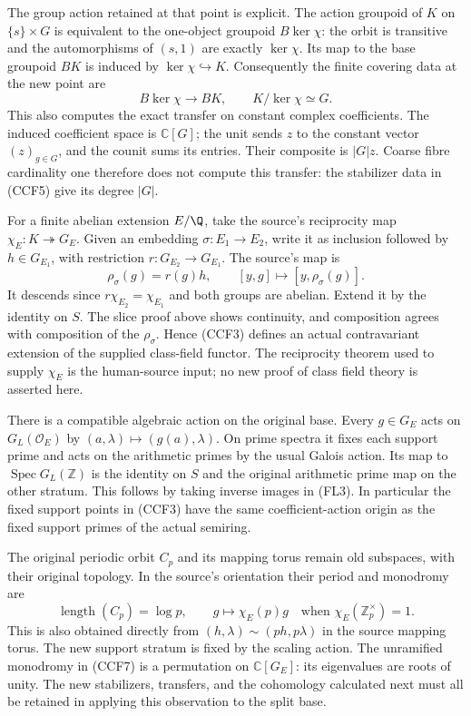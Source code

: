 \documentclass[11pt,a4paper]{article}
\theoremstyle{definition}\newtheorem{definition}[theorem]{Definition}
\newcommand{\Spec}{\operatorname{Spec}}\newcommand{\SpecMon}{\operatorname{Spec}_{\mathrm{mon}}}
\begin{document}
The group action retained at that point is explicit. The action
groupoid of $K$ on $\{s\}\times G$ is equivalent to the one-object
groupoid $B\ker\chi$: the orbit is transitive and the automorphisms
of $(s,1)$ are exactly $\ker\chi$. Its map to the base groupoid
$BK$ is induced by $\ker\chi\hookrightarrow K$. Consequently
the finite covering data at the new point are
\[
 B\ker\chi\longrightarrow BK,\qquad K/\ker\chi\simeq G.
 \tag{CCF5}
\]
This also computes the exact transfer on constant complex
coefficients. The induced coefficient space is $\mathbb C[G]$;
the unit sends $z$ to the constant vector $(z)_{g\in G}$, and the
counit sums its entries. Their composite is $|G|z$. Coarse fibre
cardinality one therefore does not compute this transfer: the
stabilizer data in (CCF5) give its degree $|G|$.

For a finite abelian extension $E/\Q$, take the source's reciprocity
map $\chi_E:K\twoheadrightarrow G_E$. Given an embedding
$\sigma:E_1\to E_2$, write it as inclusion followed by $h\in G_{E_1}$,
with restriction $r:G_{E_2}\to G_{E_1}$. The source's map is
\[
 \rho_\sigma(g)=r(g)h,\qquad
 [y,g]\longmapsto[y,\rho_\sigma(g)].
 \tag{CCF6}
\]
It descends since $r\chi_{E_2}=\chi_{E_1}$ and both groups are
abelian. Extend it by the identity on $S$. The slice proof above
shows continuity, and composition agrees with composition of the
$\rho_\sigma$. Hence (CCF3) defines an actual contravariant
extension of the supplied class-field functor. The reciprocity
theorem used to supply $\chi_E$ is the human-source input; no
new proof of class field theory is asserted here.

There is a compatible algebraic action on the original base.
Every $g\in G_E$ acts on $G_L(\mathcal O_E)$ by
$(a,\lambda)\mapsto(g(a),\lambda)$. On prime spectra it fixes
each support prime and acts on the arithmetic primes by the usual
Galois action. Its map to $\Spec G_L(\mathbb Z)$ is the identity
on $S$ and the original arithmetic prime map on the other stratum.
This follows by taking inverse images in (FL3). In particular the
fixed support points in (CCF3) have the same coefficient-action
origin as the fixed support primes of the actual semiring.

The original periodic orbit $C_p$ and its mapping torus remain
old subspaces, with their original topology. In the source's
orientation their period and monodromy are
\[
 \operatorname{length}(C_p)=\log p,\qquad g\longmapsto\chi_E(p)g
 \quad\text{when }\chi_E(\mathbb Z_p^\times)=1.
 \tag{CCF7}
\]
This is also obtained directly from
$(h,\lambda)\sim(ph,p\lambda)$ in the source mapping torus.
The new support stratum is fixed by the scaling action. The
unramified monodromy in (CCF7) is a permutation on $\mathbb C[G_E]$:
its eigenvalues are roots of unity. The new stabilizers, transfers,
and the cohomology calculated next must all be retained in applying
this observation to the split base.
\end{document}
